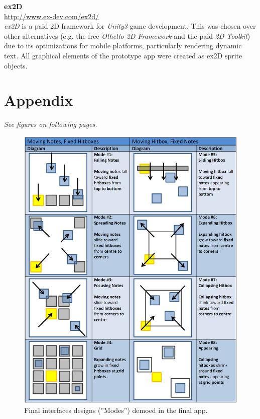 \documentclass{sig-alternate}
\begin{document}
\noindent \textbf{ex2D} \\
\url{http://www.ex-dev.com/ex2d/} \\
\textit{ex2D} is a paid 2D framework for \textit{Unity3} game development. This was chosen over other alternatives (e.g. the free \textit{Othello 2D Framework} and the paid \textit{2D Toolkit}) due to its optimizations for mobile platforms, particularly rendering dynamic text. All graphical elements of the prototype app were created as ex2D sprite objects.

\section{Appendix}
\label{sec:appendix}
\textit{See figures on following pages.}




\begin{figure}[htb!]
	\begin{center}
		\includegraphics[width=1\linewidth]{figure_demo_interfaces}
	\end{center}
	\vspace{-12pt}
	\caption{Final interfaces designs (''Modes'') demoed in the final app.}
	\label{fig:demo_interfaces}
\end{figure}
\end{document}
